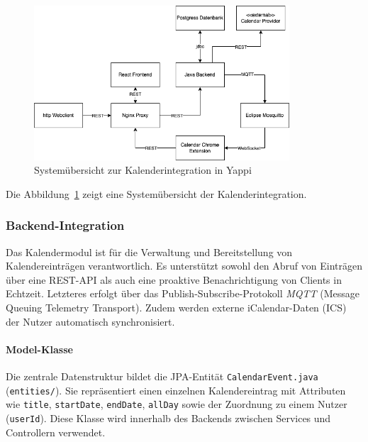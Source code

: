 \documentclass[12pt,a4paper]{report}
\begin{document}
    \begin{figure}[!htbp]
      \centering
      \includegraphics[width=0.85\textwidth]{../figures/implementation-claendar-companion-system.drawio.png}
      \caption{Systemübersicht zur Kalenderintegration in Yappi}
      \label{fig:implementation-calendar-companion-system}
    \end{figure}

    Die Abbildung~\ref{fig:implementation-calendar-companion-system} zeigt eine Systemübersicht der Kalenderintegration.

\subsubsection{Backend-Integration}

    Das Kalendermodul ist für die Verwaltung und Bereitstellung von Kalendereinträgen verantwortlich.
    Es unterstützt sowohl den Abruf von Einträgen über eine REST-API als auch eine proaktive Benachrichtigung von Clients in Echtzeit.
    Letzteres erfolgt über das Publish-Subscribe-Protokoll \textit{MQTT} (Message Queuing Telemetry Transport).
    Zudem werden externe iCalendar-Daten (ICS) der Nutzer automatisch synchronisiert.

\paragraph{Model-Klasse}
    Die zentrale Datenstruktur bildet die JPA-Entität \texttt{CalendarEvent.java} (\texttt{entities/}).
    Sie repräsentiert einen einzelnen Kalendereintrag mit Attributen wie \texttt{title}, \texttt{startDate}, \texttt{endDate}, \texttt{allDay} sowie der Zuordnung zu einem Nutzer (\texttt{userId}).
    Diese Klasse wird innerhalb des Backends zwischen Services und Controllern verwendet.
\end{document}
